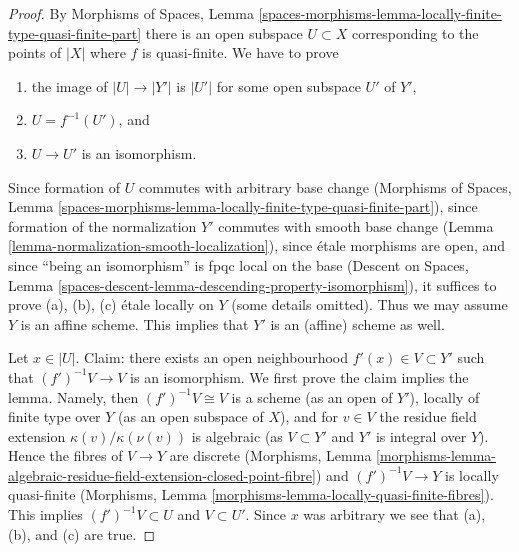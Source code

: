 \documentclass[10pt,a4paper]{amsart}
\theoremstyle{plain}
\theoremstyle{definition}
\theoremstyle{remark}
\numberwithin{equation}{subsection}
\begin{document}
\begin{proof}
By Morphisms of Spaces, Lemma
\ref{spaces-morphisms-lemma-locally-finite-type-quasi-finite-part}
there is an open subspace $U \subset X$ corresponding to the points
of $|X|$ where $f$ is quasi-finite. We have to prove
\begin{enumerate}
\item[(a)] the image of $|U| \to |Y'|$ is $|U'|$ for some open subspace
$U'$ of $Y'$,
\item[(b)] $U = f^{-1}(U')$, and
\item[(c)] $U \to U'$ is an isomorphism.
\end{enumerate}
Since formation of $U$ commutes with arbitrary base change
(Morphisms of Spaces, Lemma
\ref{spaces-morphisms-lemma-locally-finite-type-quasi-finite-part}),
since formation of the normalization $Y'$ commutes with smooth
base change (Lemma \ref{lemma-normalization-smooth-localization}),
since \'etale morphisms are open, and
since ``being an isomorphism'' is fpqc local on the base
(Descent on Spaces, Lemma
\ref{spaces-descent-lemma-descending-property-isomorphism}),
it suffices to prove (a), (b), (c) \'etale locally on $Y$
(some details omitted). Thus
we may assume $Y$ is an affine scheme. This implies that $Y'$ is
an (affine) scheme as well.

\medskip\noindent
Let $x \in |U|$. Claim: there exists an open
neighbourhood $f'(x) \in V \subset Y'$ such that $(f')^{-1}V \to V$ is an
isomorphism. We first prove the claim implies the lemma.
Namely, then $(f')^{-1}V \cong V$ is a scheme (as an open
of $Y'$), locally of finite type over $Y$ (as an open subspace of $X$),
and for $v \in V$ the residue field extension
$\kappa(v)/\kappa(\nu(v))$ is algebraic (as
$V \subset Y'$ and $Y'$ is integral over $Y$). Hence the fibres
of $V \to Y$ are discrete (Morphisms, Lemma
\ref{morphisms-lemma-algebraic-residue-field-extension-closed-point-fibre})
and $(f')^{-1}V \to Y$ is locally quasi-finite
(Morphisms, Lemma \ref{morphisms-lemma-locally-quasi-finite-fibres}).
This implies $(f')^{-1}V \subset U$ and $V \subset U'$. Since $x$ was
arbitrary we see that (a), (b), and (c) are true.


\end{proof}
\end{document}
